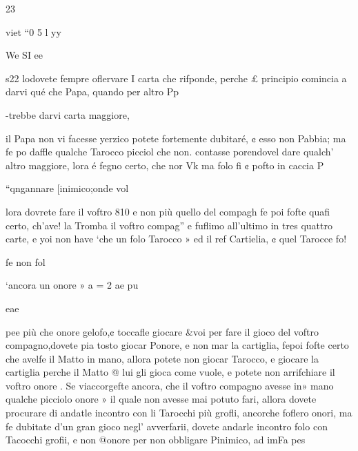 \documentclass[12pt,a6paper]{article}
\begin{document}
   

23

  
      
  

 
 

 

 

 

 

viet
“0 5 l
yy

 

 

 

We SI ee

s22
lodovete fempre oflervare I
carta che rifponde, perche £
principio comincia a darvi qué
che Papa, quando per altro Pp

-trebbe darvi carta maggiore,

il Papa non vi facesse yerzico
potete fortemente dubitaré, ¢
esso non Pabbia; ma fe po%
daffle qualche Tarocco picciol
che non. contasse porendovel
dare qualch’ altro maggiore,
lora é fegno certo, che nor Vk
ma folo fi ¢ pofto in caccia P

“qngannare [inimico;onde vol

lora dovrete fare il voftro 810
e non più quello del compagh
fe poi fofte quafi certo, ch’ave!
la Tromba il voftro compag”
e fuflimo all’ultimo in tres
quattro carte, e yoi non have
‘che un folo Tarocco » ed il ref
Cartielia, ¢ quel Tarocce fo!

fe non fol

‘ancora un onore » a
= 2 ae pu

eae
  
  

pee
più che onore gelofo,¢ toccafle
giocare &voi per fare il gioco
del voftro compagno,dovete pia
tosto giocar Ponore, e non mar
la cartiglia, fepoi fofte certo
che avelfe il Matto in mano, allora potete non giocar Tarocco,
e giocare la cartiglia perche
il Matto @ lui gli gioca come
vuole, e potete non arrifchiare
il voftro onore .
Se viaccorgefte ancora, che
il voftro compagno avesse in»
mano qualche picciolo onore »
il quale non avesse mai potuto
fari, allora dovete procurare di
andatle incontro con li Tarocchi più grofli, ancorche foflero
onori, ma fe dubitate d'un gran
gioco negl’ avverfarii, dovete
andarle incontro folo con Tacocchi grofii, e non @onore per
non obbligare Pinimico, ad imFa pes

 

 

 
 

 
\end{document}

